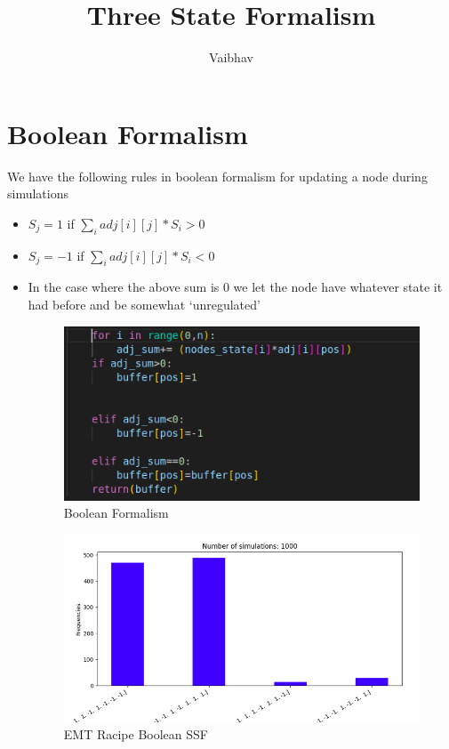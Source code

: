 \documentclass{article}
\title{Three State Formalism}
\author{Vaibhav}
\begin{document}
\maketitle
\section{Boolean Formalism}
We have the following rules in boolean formalism for updating a node during simulations

\begin{itemize}

	\item $ S_j = 1 $ if    $  \sum_{ i } ^ { } adj[i][j] * S_i> 0 $ 

	\item $ S_j = -1 $ if    $  \sum_{ i } ^ { } adj[i][j] * S_i< 0 $

	\item In the case where the above sum is 0 we let the node have whatever state it had before and be somewhat `unregulated'

		\begin{figure}[H] \centering 
		
			\includegraphics[scale=0.5]{img/boolean_formalism.png}
			\caption{Boolean Formalism}
		\end{figure}

		\begin{figure}[H]
		\centering
		\includegraphics[scale=0.4]{img/emtracipe.png}
		\caption{EMT Racipe Boolean SSF}
		\end{figure}



\end{itemize}
\end{document}
